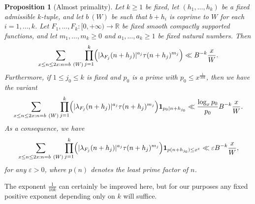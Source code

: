 \documentclass{bmcart}
\theoremstyle{plain}
\newtheorem{proposition}[theorem]{Proposition}
\theoremstyle{definition}
\newcommand\R{\mathbb{R}}
\newcommand\eps{\varepsilon}
\newcommand{\onef}{\mathbf{1}}
\begin{document}
\begin{proposition}[Almost primality]\label{almostprime} Let $k \geq 1$ be fixed, let $(h_1,\dots,h_k)$ be a fixed admissible $k$-tuple, and let $b\ (W)$ be such that $b+h_i$ is coprime to $W$ for each $i=1,\dots,k$.  Let $F_1,\dots,F_k: [0,+\infty) \to \R$ be fixed smooth compactly supported functions, and let $m_1,\dots,m_k \geq 0$ and $a_1,\dots,a_k \geq 1$ be fixed natural numbers.  Then
\begin{equation}\label{lambdatau}
\sum_{x \leq n \leq 2x: n = b\ (W)} \prod_{j=1}^k \Bigl(|\lambda_{F_j}(n+h_j)|^{a_j} \tau(n+h_j)^{m_j}\Bigr) \ll B^{-k} \frac{x}{W}.
\end{equation}
Furthermore, if $1 \leq j_0 \leq k$ is fixed and $p_0$ is a prime with $p_0 \leq x^{\frac{1}{10k}}$, then we have the variant
\begin{equation}\label{lambdatau-fix}
\sum_{x \leq n \leq 2x: n = b\ (W)} \prod_{j=1}^k \Bigl(|\lambda_{F_j}(n+h_j)|^{a_j} \tau(n+h_j)^{m_j}\Bigr) \onef_{p_0|n+h_{j_0}} \ll \frac{\log_x p_0}{p_0} B^{-k} \frac{x}{W}.
\end{equation}
As a consequence, we have
\begin{equation}\label{lambdatau-fix2}
\sum_{x \leq n \leq 2x: n = b\ (W)} \prod_{j=1}^k \Bigl(|\lambda_{F_j}(n+h_j)|^{a_j} \tau(n+h_j)^{m_j}\Bigr) \onef_{p(n+h_{j_0}) \leq x^\eps} \ll \eps B^{-k} \frac{x}{W},
\end{equation}
for any $\eps > 0$, where $p(n)$ denotes the least prime factor of $n$.
\end{proposition}

The exponent $\frac{1}{10k}$ can certainly be improved here, but for our purposes any fixed positive exponent depending only on $k$ will suffice.
\end{document}
